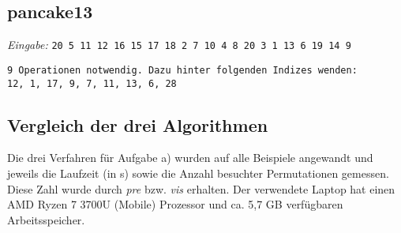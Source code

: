 \documentclass[a4paper, 10pt, ngerman]{article}
\begin{document}
\subsection*{pancake13}
\scriptsize \emph{Eingabe: }\verb|20 5 11 12 16 15 17 18 2 7 10 4 8 20 3 1 13 6 19 14 9|
\normalsize
\begin{lstlisting}[numbers=none]
9 Operationen notwendig. Dazu hinter folgenden Indizes wenden:
12, 1, 17, 9, 7, 11, 13, 6, 28
\end{lstlisting}

\subsection{Vergleich der drei Algorithmen}

Die drei Verfahren für Aufgabe a) wurden auf alle Beispiele angewandt und jeweils die Laufzeit (in s) sowie die Anzahl besuchter Permutationen gemessen. Diese Zahl wurde durch \emph{pre} bzw. \emph{vis} erhalten. Der verwendete Laptop hat einen AMD Ryzen 7 3700U (Mobile) Prozessor und ca. 5,7 GB verfügbaren Arbeitsspeicher.
\end{document}
